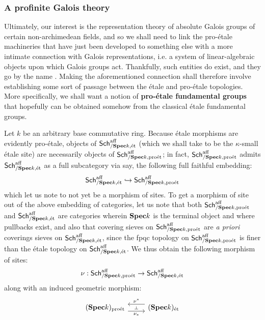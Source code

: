             \subsubsection{A profinite Galois theory}
                Ultimately, our interest is the representation theory of absolute Galois groups of certain non-archimedean fields, and so we shall need to link the pro-\'etale machineries that have just been developed to something else with a more intimate connection with Galois representations, i.e. a system of linear-algebraic objects upon which Galois groups act. Thankfully, such entities do exist, and they go by the name . Making the aforementioned connection shall therefore involve establishing some sort of passage between the \'etale and pro-\'etale topologies. More specifically, we shall want a notion of \textbf{pro-\'etale fundamental groups} that hopefully can be obtained somehow from the classical \'etale fundamental groups. 
                
                \begin{remark} \label{remark: etale_comparison_site_morphism}
                    Let $k$ be an arbitrary base commutative ring. Because \'etale morphisms are evidently pro-\'etale, objects of $\mathsf{Sch}^{\mathrm{aff}}_{/\mathbf{Spec} k, \mathrm{\acute{e}t}}$ (which we shall take to be the $\kappa$-small \'etale site) are necessarily objects of $\mathsf{Sch}^{\mathrm{aff}}_{/\mathbf{Spec} k, \mathrm{pro\acute{e}t}}$; in fact, $\mathsf{Sch}^{\mathrm{aff}}_{/\mathbf{Spec} k, \mathrm{pro\acute{e}t}}$ admits $\mathsf{Sch}^{\mathrm{aff}}_{/\mathbf{Spec} k, \mathrm{\acute{e}t}}$ as a full subcategory via say, the following full faithful embedding:
                        $$\mathsf{Sch}^{\mathrm{aff}}_{/\mathbf{Spec} k, \mathrm{\acute{e}t}} \hookrightarrow \mathsf{Sch}^{\mathrm{aff}}_{/\mathbf{Spec} k, \mathrm{pro\acute{e}t}}$$
                    which let us note to not yet be a morphism of sites. To get a morphism of site out of the above embedding of categories, let us note that both $\mathsf{Sch}^{\mathrm{aff}}_{/\mathbf{Spec} k, \mathrm{pro\acute{e}t}}$ and $\mathsf{Sch}^{\mathrm{aff}}_{/\mathbf{Spec} k, \mathrm{\acute{e}t}}$ are categories wherein $\mathbf{Spec} k$ is the terminal object and where pullbacks exist, and also that covering sieves on $\mathsf{Sch}^{\mathrm{aff}}_{/\mathbf{Spec} k, \mathrm{pro\acute{e}t}}$ are \textit{a priori} coverings sieves on $\mathsf{Sch}^{\mathrm{aff}}_{/\mathbf{Spec} k, \mathrm{\acute{e}t}}$, since the fpqc topology on $\mathsf{Sch}^{\mathrm{aff}}_{/\mathbf{Spec} k, \mathrm{pro\acute{e}t}}$ is finer than the \'etale topology on $\mathsf{Sch}^{\mathrm{aff}}_{/\mathbf{Spec} k, \mathrm{\acute{e}t}}$. We thus obtain the following morphism of sites:
                        $$\nu: \mathsf{Sch}^{\mathrm{aff}}_{/\mathbf{Spec} k, \mathrm{pro\acute{e}t}} \to \mathsf{Sch}^{\mathrm{aff}}_{/\mathbf{Spec} k, \mathrm{\acute{e}t}}$$
                    along with an induced geometric morphism:
                        $$
                            \begin{tikzcd}
                            	{(\Spec k)_{\proet}} & {(\Spec k)_{\et}}
                            	\arrow[""{name=0, anchor=center, inner sep=0}, "{\nu_*}"', shift right=2, from=1-1, to=1-2]
                            	\arrow[""{name=1, anchor=center, inner sep=0}, "{\nu^*}"', shift right=2, from=1-2, to=1-1]
                            	\arrow["\dashv"{anchor=center, rotate=-90}, draw=none, from=1, to=0]
                            \end{tikzcd}
                        $$
                \end{remark}
                
